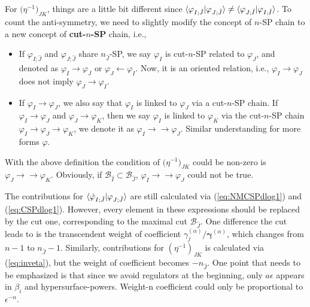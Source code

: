 \documentclass[a4paper,11pt]{article}
\newcommand{\ep}{\epsilon}
\def\eref#1{(\ref{#1})}
\begin{document}
For $\big( \eta^{-1} \big)_{JK}$, things are a little bit different since
$\braket{\varphi_{I;\hat{J}}|\varphi_{J;\hat{J}}}\neq \braket{\varphi_{J;\hat{I}}|\varphi_{I;\hat{I}}}$. 
To count the anti-symmetry, we need to slightly modify the concept of $n$-SP chain to a new concept of {\bf cut-$n$-SP} chain, i.e.,
\begin{itemize}
\item If ${\varphi}_{I;\hat{J}}$ and $\varphi_{J;\hat{J}}$ share $n_{\hat{J}}$-SP,  we say $\varphi_I$ is cut-$n$-SP related to $\varphi_J$, and denoted as $\varphi_I \rightarrow \varphi_J$ or $\varphi_J \leftarrow \varphi_I$. Now, it is an oriented relation, i.e., $\varphi_I \rightarrow \varphi_J$ does not imply $\varphi_J \rightarrow \varphi_I$. %

\item If $\varphi_I \rightarrow \varphi_J$, we also say that $\varphi_I$ is linked to $\varphi_J$ via a cut-$n$-SP chain. If $\varphi_I \rightarrow \varphi_J$ and $\varphi_J \rightarrow \varphi_K$, then we say $\varphi_I$ is linked to $\varphi_K$ via the cut-$n$-SP chain $\varphi_I \rightarrow \varphi_J \rightarrow \varphi_K$, we denote it as $\varphi_I \rightarrow\rightarrow \varphi_J$. Similar understanding for more forms $\varphi$.  
\end{itemize}
With the above definition the condition of $\big( \eta^{-1} \big)_{JK}$ could be non-zero is  $\varphi_J \rightarrow\rightarrow \varphi_K$. Obviously, if  $\mathcal{B}_{\hat{I}}  \subset \mathcal{B}_{\hat{J}}$, $\varphi_I \rightarrow \rightarrow \varphi_J$ could not be true.

The contributions for $\braket{\dot{\varphi}_{I;\hat{J}}|\varphi_{J;\hat{J}}}$  are still calculated via \eref{eq:NMCSPdlog1} and \eref{eq:CSPdlog1}. However, every element in these expressions should be replaced by the cut one, corresponding to the maximal cut  $\mathcal{B}_{\hat{J}}$. One difference the cut leads to is the transcendent weight of coefficient $\gamma^{(\alpha)}_j/\bm{\gamma}^{(\alpha)}$,  which changes from $n-1$ to   $n_{\hat{J}}-1$. Similarly, contributions for $\left(\eta^{-1}\right)_{JK}$ is calculated via \eref{eq:inveta}, but the weight of coefficient becomes $-n_{\hat{J}}$. One point that needs to be emphasized is that
since we avoid regulators at the beginning, only $a \ep$ appears in $\beta_i$ and hypersurface-powers.  Weight-n coefficient could only be proportional  to $\ep^{-n}$.
\end{document}
